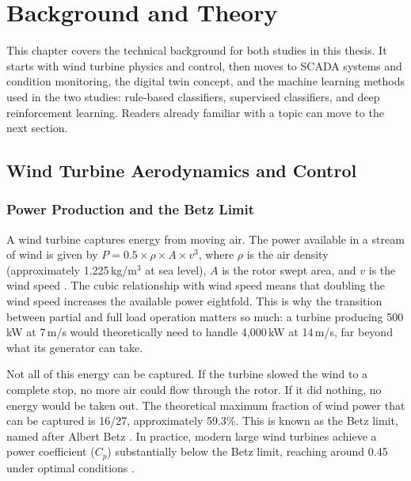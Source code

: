 \chapter{Background and Theory}
\label{chap:background}

This chapter covers the technical background for both studies in this thesis. It starts
with wind turbine physics and control, then moves to SCADA systems and condition
monitoring, the digital twin concept, and the machine learning methods used in the two
studies: rule-based classifiers, supervised classifiers, and deep reinforcement learning.
Readers already familiar with a topic can move to the next section.

\section{Wind Turbine Aerodynamics and Control}
\label{sec:bg:aero}

\subsection{Power Production and the Betz Limit}
\label{subsec:bg:betz}

A wind turbine captures energy from moving air. The power available in a stream of wind
is given by $P = 0.5 \times \rho \times A \times v^3$, where $\rho$ is the air density
(approximately 1.225\,kg/m$^3$ at sea level), $A$ is the rotor swept area, and $v$ is
the wind speed \citep{manwell2009}. The cubic relationship with wind speed means that
doubling the wind speed increases the available power eightfold. This is why the
transition between partial and full load operation matters so much: a turbine producing
500\,kW at 7\,m/s would theoretically need to handle 4,000\,kW at 14\,m/s, far beyond
what its generator can take.

Not all of this energy can be captured. If the turbine slowed the wind to a complete
stop, no more air could flow through the rotor. If it did nothing, no energy would be
taken out. The theoretical maximum fraction of wind power that can be captured is 16/27,
approximately 59.3\%. This is known as the Betz limit, named after Albert Betz \citep{manwell2009}.
In practice, modern large wind turbines achieve a power coefficient ($C_p$)
substantially below the Betz limit, reaching around 0.45 under optimal conditions
\citep{manwell2009}.

